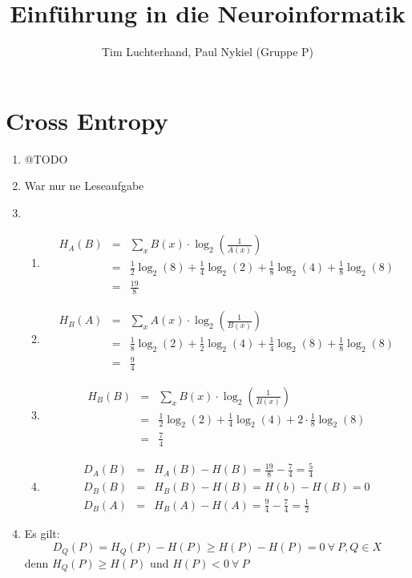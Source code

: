 \documentclass[DIN, pagenumber=false, fontsize=11pt, parskip=half]{scrartcl}
\title{Einführung in die Neuroinformatik}
\author{Tim Luchterhand, Paul Nykiel (Gruppe P)}
\begin{document}
    \maketitle
    \section{Cross Entropy}
    \begin{enumerate}
		\item @TODO
		\item War nur ne Leseaufgabe
		\item
			\begin{enumerate}[label=(\alph*)]
				\item
					\begin{eqnarray*}
							H_A(B) &=& \sum_x{B(x)\cdot \log_2\left(\frac{1}{A(x)}\right)} \\
							&=& \frac{1}{2} \log_2(8) + \frac{1}{4} \log_2(2) + \frac{1}{8} \log_2(4) + \frac{1}{8} \log_2(8) \\
							&=&\frac{19}{8}
					\end{eqnarray*}
				\item
					\begin{eqnarray*}
							H_B(A) &=& \sum_x{A(x)\cdot \log_2\left(\frac{1}{B(x)}\right)} \\
							&=& \frac{1}{8} \log_2(2) + \frac{1}{2} \log_2(4) + \frac{1}{4} \log_2(8) + \frac{1}{8} \log_2(8) \\
							&=&\frac{9}{4}
					\end{eqnarray*}
				\item
					\begin{eqnarray*}
							H_B(B) &=& \sum_x{B(x)\cdot \log_2\left(\frac{1}{B(x)}\right)} \\
							&=& \frac{1}{2} \log_2(2) + \frac{1}{4} \log_2(4) + 2 \cdot \frac{1}{8} \log_2(8) \\
							&=&\frac{7}{4}
					\end{eqnarray*}
				\item
					\begin{eqnarray*}
							D_A(B) &=& H_A(B) - H(B) = \frac{19}{8} - \frac{7}{4} = \frac{5}{4} \\
							D_B(B) &=& H_B(B) - H(B) = H(b) - H(B) = 0 \\
							D_B(A) &=& H_B(A) - H(A) = \frac{9}{4} - \frac{7}{4} = \frac{1}{2} 
					\end{eqnarray*}
			\end{enumerate}
		\item Es gilt:
			\begin{equation*}
					D_Q(P) = H_Q(P) - H(P) \geq H(P) - H(P) = 0 \ \forall \ P,Q \in X
			\end{equation*}
			denn $H_Q(P)\geq H(P)$ und $H(P) < 0 \ \forall \ P$


\end{enumerate}
\end{document}
